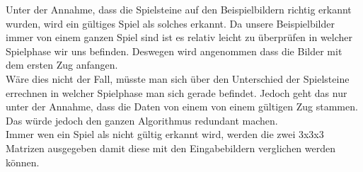 \documentclass[paper=A4, deutsch]{scrartcl}
\begin{document}
Unter der Annahme, dass die Spielsteine auf den Beispielbildern richtig erkannt wurden, wird ein gültiges Spiel als solches erkannt. Da unsere Beispielbilder immer von einem ganzen Spiel sind ist es relativ leicht zu überprüfen in welcher Spielphase wir uns befinden. Deswegen wird angenommen dass die Bilder mit dem ersten Zug anfangen.\\
Wäre dies nicht der Fall, müsste man sich über den Unterschied der Spielsteine errechnen in welcher Spielphase man sich gerade befindet. Jedoch geht das nur unter der Annahme, dass die Daten von einem von einem gültigen Zug stammen. Das würde jedoch den ganzen Algorithmus redundant machen.\\
Immer wen ein Spiel als nicht gültig erkannt wird, werden die zwei 3x3x3 Matrizen ausgegeben damit diese mit den Eingabebildern verglichen werden können.
\end{document}

